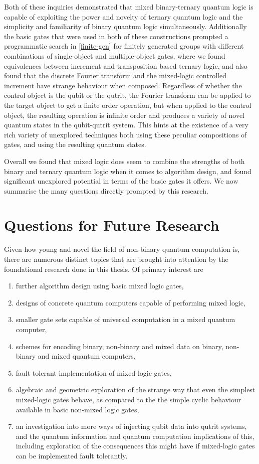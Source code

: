 Both of these inquiries demonstrated that mixed binary-ternary quantum logic is capable of exploiting the power and novelty of ternary quantum logic and the simplicity and familiarity of binary quantum logic simultaneously. Additionally the basic gates that were used in both of these constructions prompted a programmatic search in \autoref{finite-gen} for finitely generated groups with different combinations of single-object and multiple-object gates, where we found equivalences between increment and transposition based ternary logic, and also found that the discrete Fourier transform and the mixed-logic controlled increment have strange behaviour when composed. Regardless of whether the control object is the qubit or the qutrit, the Fourier transform can be applied to the target object to get a finite order operation, but when applied to the control object, the resulting operation is infinite order and produces a variety of novel quantum states in the qubit-qutrit system. This hints at the existence of a very rich variety of unexplored techniques both using these peculiar compositions of gates, and using the resulting quantum states.

Overall we found that mixed logic does seem to combine the strengths of both binary and ternary quantum logic when it comes to algorithm design, and found significant unexplored potential in terms of the basic gates it offers. We now summarise the many questions directly prompted by this research.

\section{Questions for Future Research}

Given how young and novel the field of non-binary quantum computation is, there are numerous distinct topics that are brought into attention by the foundational research done in this thesis. Of primary interest are
\begin{enumerate}
	\item further algorithm design using basic mixed logic gates,
	\item designs of concrete quantum computers capable of performing mixed logic,
	\item smaller gate sets capable of universal computation in a mixed quantum computer,
	\item schemes for encoding binary, non-binary and mixed data on binary, non-binary and mixed quantum computers,
	\item fault tolerant implementation of mixed-logic gates,
	\item algebraic and geometric exploration of the strange way that even the simplest mixed-logic gates behave, as compared to the the simple cyclic behaviour available in basic non-mixed logic gates,
	\item an investigation into more ways of injecting qubit data into qutrit systems, and the quantum information and quantum computation implications of this, including exploration of the consequences this might have if mixed-logic gates can be implemented fault tolerantly.
\end{enumerate}

